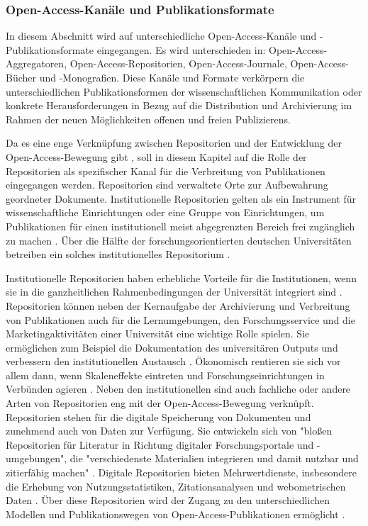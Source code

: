 \subsubsection{Open-Access-Kanäle und Publikationsformate}

In diesem Abschnitt wird auf unterschiedliche Open-Access-Kanäle und -Publikationsformate eingegangen. Es wird unterschieden in: Open-Access-Aggregatoren, Open-Access-Repositorien, Open-Access-Journale, Open-Access-Bücher und -Monografien. Diese Kanäle und Formate verkörpern die unterschiedlichen Publikationsformen der wissenschaftlichen Kommunikation oder konkrete Herausforderungen in Bezug auf die Distribution und Archivierung im Rahmen der neuen Möglichkeiten offenen und freien Publizierens.

Da es eine enge Verknüpfung zwischen Repositorien und der Entwicklung der Open-Access-Bewegung gibt \cite{Adema_2013} \cite{Offhaus_2012}, soll in diesem Kapitel auf die Rolle der Repositorien als spezifischer Kanal für die Verbreitung von Publikationen eingegangen werden. Repositorien sind verwaltete Orte zur Aufbewahrung geordneter Dokumente. Institutionelle Repositorien gelten als ein Instrument für wissenschaftliche Einrichtungen oder eine Gruppe von Einrichtungen, um Publikationen für einen institutionell meist abgegrenzten Bereich frei zugänglich zu machen \cite{Dobratz_2007} \cite{Baggs_2006}. Über die Hälfte der forschungsorientierten deutschen Universitäten betreiben ein solches institutionelles Repositorium \cite{Schmidt_2009}.

Institutionelle Repositorien haben erhebliche Vorteile für die Institutionen, wenn sie in die ganzheitlichen Rahmenbedingungen der Universität integriert sind \cite{Steele_2006}. Repositorien können neben der Kernaufgabe der Archivierung und Verbreitung von Publikationen auch für die Lernumgebungen, den Forschungsservice und die Marketingaktivitäten einer Universität eine wichtige Rolle spielen. Sie ermöglichen zum Beispiel die Dokumentation des universitären Outputs und verbessern den institutionellen Austausch \cite{Steele_2006}. Ökonomisch rentieren sie sich vor allem dann, wenn Skaleneffekte eintreten und Forschungseinrichtungen in Verbünden agieren \cite{Blythe_2005}. Neben den institutionellen sind auch fachliche oder andere Arten von Repositorien eng mit der Open-Access-Bewegung verknüpft. Repositorien stehen für die digitale Speicherung von Dokumenten und zunehmend auch von Daten zur Verfügung. Sie entwickeln sich von "bloßen Repositorien für Literatur in Richtung digitaler Forschungsportale und -umgebungen", die "verschiedenste Materialien integrieren und damit nutzbar und zitierfähig machen" \cite[:10]{Schmidt_2009}. Digitale Repositorien bieten Mehrwertdienste, insbesondere die Erhebung von Nutzungsstatistiken, Zitationsanalysen und webometrischen Daten \cite{Jahn_2011} \cite{Mayr_2005}. Über diese Repositorien wird der Zugang zu den unterschiedlichen Modellen und Publikationswegen von Open-Access-Publikationen ermöglicht \cite{Suber_2015}.

